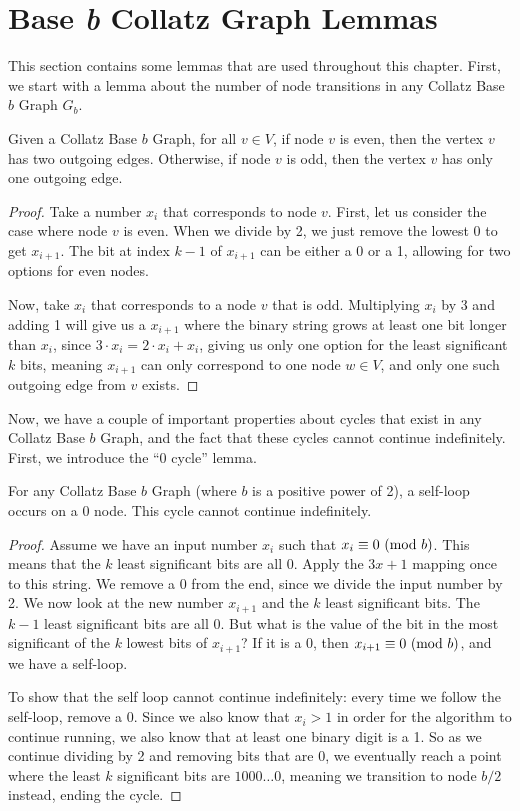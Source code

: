 \section{Base \textit{b} Collatz Graph Lemmas}
This section contains some lemmas that are used throughout this chapter. First, we start with a lemma about the number of node transitions in any Collatz Base $b$ Graph $G_b$.
\begin{lemma}
\label{lem:numOutEdges}
Given a Collatz Base $b$ Graph, for all $v \in V$, if node $v$ is even, then the vertex $v$ has two outgoing edges. Otherwise, if node $v$ is odd, then the vertex $v$ has only one outgoing edge.
\end{lemma}
\begin{proof}
Take a number $x_i$ that corresponds to node $v$. First, let us consider the case where node $v$ is even. When we divide by 2, we just remove the lowest 0 to get $x_{i+1}$. The bit at index $k-1$ of $x_{i+1}$ can be either a 0 or a 1, allowing for two options for even nodes. \par
Now, take $x_i$ that corresponds to a node $v$ that is odd. Multiplying $x_i$ by 3 and adding 1 will give us a $x_{i+1}$ where the binary string grows at least one bit longer than $x_i$, since $3\cdot x_i = 2 \cdot x_i + x_i$, giving us only one option for the least significant $k$ bits, meaning $x_{i+1}$ can only correspond to one node $w \in V$, and only one such outgoing edge from $v$ exists.
\end{proof}
Now, we have a couple of important properties about cycles that exist in any Collatz Base $b$ Graph, and the fact that these cycles cannot continue indefinitely. First, we introduce the ``0 cycle'' lemma.
\begin{lemma}
\label{lem:zeroCycle}
For any Collatz Base $b$ Graph (where $b$ is a positive power of 2), a self-loop occurs on a 0 node. This cycle cannot continue indefinitely.
\end{lemma}
\begin{proof}
Assume we have an input number $x_i$ such that $x_i \equiv 0 \ (\mathrm{mod}\ b)$. This means that the $k$ least significant bits are all 0. Apply the $3x+1$ mapping once to this string. We remove a 0 from the end, since we divide the input number by 2. We now look at the new number $x_{i+1}$ and the $k$ least significant bits. The $k-1$ least significant bits are all 0. But what is the value of the bit in the most significant of the $k$ lowest bits of $x_{i+1}$? If it is a 0, then $x_{i+1} \equiv 0 \ (\mathrm{mod}\ b)$, and we have a self-loop. \par
To show that the self loop cannot continue indefinitely: every time we follow the self-loop, remove a 0. Since we also know that $x_i > 1$ in order for the algorithm to continue running, we also know that at least one binary digit is a 1. So as we continue dividing by 2 and removing bits that are 0, we eventually reach a point where the least $k$ significant bits are $1000\ldots 0$, meaning we transition to node $b/2$ instead, ending the cycle.
\end{proof}
